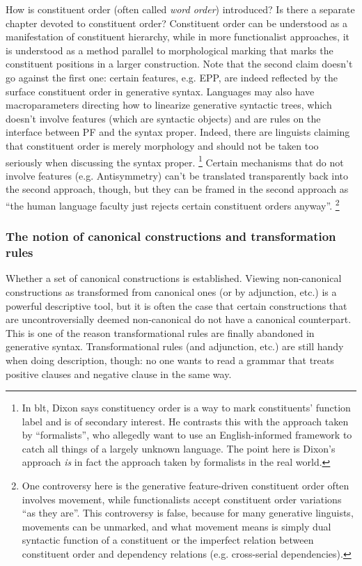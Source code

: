 \documentclass[UTF8, a4paper, oneside, scheme=plain]{ctexart}
\newcommand*{\term}[1]{\emph{#1}}
\begin{document}
How is constituent order (often called \term{word order}) introduced?
Is there a separate chapter devoted to constituent order?
Constituent order can be understood as a manifestation of constituent hierarchy,
while in more functionalist approaches, 
it is understood as a method parallel to morphological marking that 
marks the constituent positions in a larger construction.
Note that the second claim doesn't go against the first one:
certain features, e.g. EPP, 
are indeed reflected by the surface constituent order in generative syntax.
Languages may also have macroparameters directing how to linearize generative syntactic trees,
which doesn't involve features (which are syntactic objects) 
and are rules on the interface between PF and the syntax proper.
Indeed, there are linguists claiming that constituent order is merely morphology 
and should not be taken too seriously when discussing the syntax proper.%
\footnote{
    In \ac{blt}, Dixon says constituency order is a way 
    to mark constituents' function label and is of secondary interest.
    He contrasts this with the approach taken by ``formalists'',
    who allegedly want to use an English-informed framework to catch all things 
    of a largely unknown language.
    The point here is Dixon's approach \emph{is} in fact 
    the approach taken by formalists in the real world. 
}
Certain mechanisms that do not involve features (e.g. Antisymmetry)
can't be translated transparently back into the second approach, though,
but they can be framed in the second approach as 
``the human language faculty just rejects certain constituent orders anyway''.%
\footnote{
    One controversy here is the generative feature-driven constituent order often involves movement,
    while functionalists accept constituent order variations ``as they are''.
    This controversy is false, because for many generative linguists, 
    movements can be unmarked, and what movement means is simply 
    dual syntactic function of a constituent 
    or the imperfect relation between constituent order and dependency relations
    (e.g. cross-serial dependencies).
}

\subsubsection{The notion of canonical constructions and transformation rules}

Whether a set of canonical constructions is established.
Viewing non-canonical constructions as transformed from canonical ones (or by adjunction, etc.) 
is a powerful descriptive tool,
but it is often the case that certain constructions 
that are uncontroversially deemed non-canonical do not have a canonical counterpart.
This is one of the reason transformational rules are finally abandoned in generative syntax.
Transformational rules (and adjunction, etc.) are still handy when doing description, though:
no one wants to read a grammar that treats positive clauses and negative clause in the same way.
\end{document}
